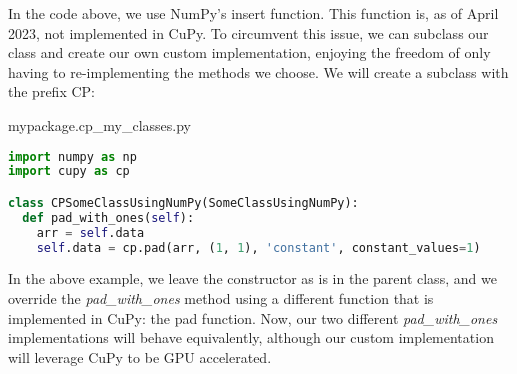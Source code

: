 In the code above, we use NumPy's insert function.
This function is, as of April 2023, not implemented in CuPy.
To circumvent this issue, we can subclass our class and create our own custom implementation, enjoying the freedom of only having to re-implementing the methods we choose.
We will create a subclass with the prefix CP:
\begin{center}
mypackage.cp\_my\_classes.py
\end{center}
\begin{lstlisting}[language=Python,style=pycode]
import numpy as np
import cupy as cp

class CPSomeClassUsingNumPy(SomeClassUsingNumPy):
  def pad_with_ones(self):
    arr = self.data
    self.data = cp.pad(arr, (1, 1), 'constant', constant_values=1)
\end{lstlisting}

In the above example, we leave the constructor as is in the parent class, and we override the \textit{pad\_with\_ones} method using a different function that is implemented in CuPy: the pad function.
Now, our two different \textit{pad\_with\_ones} implementations will behave equivalently, although our custom implementation will leverage CuPy to be GPU accelerated.
